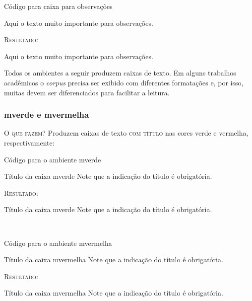 \documentclass[a4paper,12pt,oneside,openright,extrafontsizes,openbib]{memoir}
\begin{document}
{\begin{codex}{Código para caixa para observações}
	\begin{observ}
	Aqui o texto muito importante para observações.
	\end{observ}
\end{codex}

\textsc{Resultado:}
\begin{observ}
	Aqui o texto muito importante para observações.
\end{observ}


Todos os ambientes a seguir produzem caixas de texto. Em alguns trabalhos acadêmicos o \textit{corpus} precisa ser exibido com diferentes formatações e, por isso, muitas devem ser diferenciados para facilitar a leitura. 

\subsubsection{mverde e mvermelha}

\textsc{O que fazem?} Produzem caixas de texto \textsc{com título} nas cores verde e vermelha, respectivamente:

\begin{codex}{Código para o ambiente mverde}
	\begin{mverde}{Título da caixa mverde}
	Note que a indicação do título é obrigatória.
	\end{mverde}
\end{codex}

\textsc{Resultado:}
\begin{mverde}{Título da caixa mverde}
	Note que a indicação do título é obrigatória.
\end{mverde}
\ \\

\begin{codex}{Código para o ambiente mvermelha}
	\begin{mvermelha}{Título da caixa mvermelha}
	Note que a indicação do título é obrigatória.
	\end{mvermelha}
\end{codex}

\textsc{Resultado:}
\begin{mvermelha}{Título da caixa mvermelha}
	Note que a indicação do título é obrigatória.
\end{mvermelha}
\ \\

\noindent{} 

}
\end{document}
